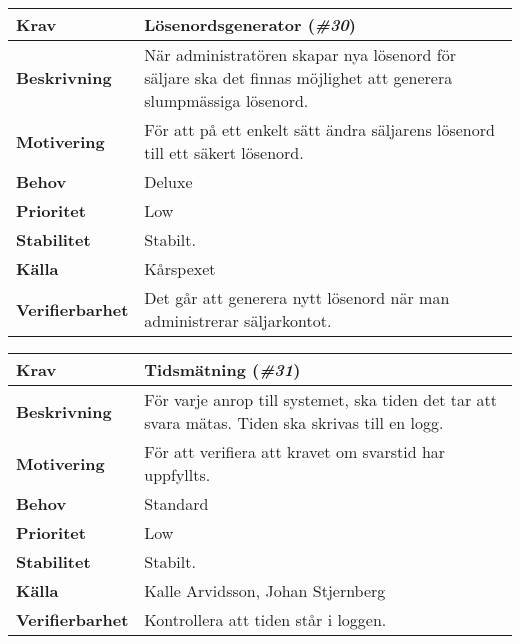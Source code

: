 \documentclass[a4paper, twoside, 11pt, titlepage]{article}
\begin{document}
	\begin{tabular} { p{2.6cm} p{12.5cm} }
		\hline
		\sffamily\textbf{Krav} & Lösenordsgenerator (\emph{\#30})  \\
		\hline
		\sffamily\textbf{Beskrivning} & När administratören skapar nya lösenord för säljare ska det finnas möjlighet att generera slumpmässiga lösenord.  \\
		\hline
		\sffamily\textbf{Motivering} & För att på ett enkelt sätt ändra säljarens lösenord till ett säkert lösenord.  \\
		\hline
		\sffamily\textbf{Behov} & Deluxe  \\
		\hline
		\sffamily\textbf{Prioritet} & Low  \\
		\hline
		\sffamily\textbf{Stabilitet} & Stabilt.  \\
		\hline
		\sffamily\textbf{Källa} & Kårspexet  \\
		\hline
		\sffamily\textbf{Verifierbarhet} & Det går att generera nytt lösenord när man administrerar säljarkontot.  \\
		\hline
	\end{tabular}
	\vspace{6mm}

	\begin{tabular} { p{2.6cm} p{12.5cm} }
		\hline
		\sffamily\textbf{Krav} & Tidsmätning (\emph{\#31})  \\
		\hline
		\sffamily\textbf{Beskrivning} & För varje anrop till systemet, ska tiden det tar att svara mätas. Tiden ska skrivas till en logg.  \\
		\hline
		\sffamily\textbf{Motivering} & För att verifiera att kravet om svarstid har uppfyllts.  \\
		\hline
		\sffamily\textbf{Behov} & Standard  \\
		\hline
		\sffamily\textbf{Prioritet} & Low  \\
		\hline
		\sffamily\textbf{Stabilitet} & Stabilt.  \\
		\hline
		\sffamily\textbf{Källa} & Kalle Arvidsson, Johan Stjernberg  \\
		\hline
		\sffamily\textbf{Verifierbarhet} & Kontrollera att tiden står i loggen.  \\
		\hline
	\end{tabular}
	\vspace{6mm}
\end{document}
